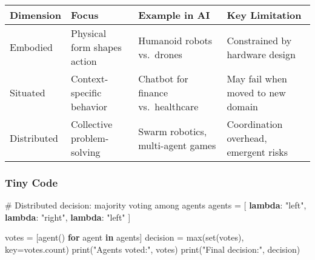 \documentclass[
  letterpaper,
  DIV=11,
  numbers=noendperiod]{scrreprt}
\newenvironment{Shaded}{\begin{snugshade}}{\end{snugshade}}
\newcommand{\BuiltInTok}[1]{\textcolor[rgb]{0.00,0.23,0.31}{#1}}
\newcommand{\CommentTok}[1]{\textcolor[rgb]{0.37,0.37,0.37}{#1}}
\newcommand{\ControlFlowTok}[1]{\textcolor[rgb]{0.00,0.23,0.31}{\textbf{#1}}}
\newcommand{\KeywordTok}[1]{\textcolor[rgb]{0.00,0.23,0.31}{\textbf{#1}}}
\newcommand{\NormalTok}[1]{\textcolor[rgb]{0.00,0.23,0.31}{#1}}
\newcommand{\OperatorTok}[1]{\textcolor[rgb]{0.37,0.37,0.37}{#1}}
\newcommand{\StringTok}[1]{\textcolor[rgb]{0.13,0.47,0.30}{#1}}
\begin{document}
\begin{longtable}[]{@{}
  >{\raggedright\arraybackslash}p{}
  >{\raggedright\arraybackslash}p{}
  >{\raggedright\arraybackslash}p{}
  >{\raggedright\arraybackslash}p{}@{}}
\toprule\noalign{}
\begin{minipage}[b]{\linewidth}\raggedright
Dimension
\end{minipage} & \begin{minipage}[b]{\linewidth}\raggedright
Focus
\end{minipage} & \begin{minipage}[b]{\linewidth}\raggedright
Example in AI
\end{minipage} & \begin{minipage}[b]{\linewidth}\raggedright
Key Limitation
\end{minipage} \\
\midrule\noalign{}
\endhead
\bottomrule\noalign{}
\endlastfoot
Embodied & Physical form shapes action & Humanoid robots vs.~drones &
Constrained by hardware design \\
Situated & Context-specific behavior & Chatbot for finance
vs.~healthcare & May fail when moved to new domain \\
Distributed & Collective problem-solving & Swarm robotics, multi-agent
games & Coordination overhead, emergent risks \\
\end{longtable}

\subsubsection{Tiny Code}\label{tiny-code-7}

\begin{Shaded}
\begin{Highlighting}[]
\CommentTok{\# Distributed decision: majority voting among agents}
\NormalTok{agents }\OperatorTok{=}\NormalTok{ [}
    \KeywordTok{lambda}\NormalTok{: }\StringTok{"left"}\NormalTok{,}
    \KeywordTok{lambda}\NormalTok{: }\StringTok{"right"}\NormalTok{,}
    \KeywordTok{lambda}\NormalTok{: }\StringTok{"left"}
\NormalTok{]}

\NormalTok{votes }\OperatorTok{=}\NormalTok{ [agent() }\ControlFlowTok{for}\NormalTok{ agent }\KeywordTok{in}\NormalTok{ agents]}
\NormalTok{decision }\OperatorTok{=} \BuiltInTok{max}\NormalTok{(}\BuiltInTok{set}\NormalTok{(votes), key}\OperatorTok{=}\NormalTok{votes.count)}
\BuiltInTok{print}\NormalTok{(}\StringTok{"Agents voted:"}\NormalTok{, votes)}
\BuiltInTok{print}\NormalTok{(}\StringTok{"Final decision:"}\NormalTok{, decision)}
\end{Highlighting}
\end{Shaded}
\end{document}
